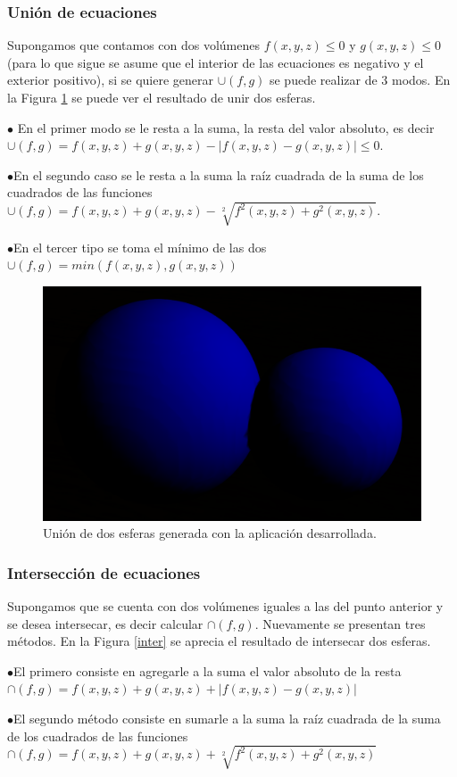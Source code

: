 \documentclass[12pt]{article}
\begin{document}
\subsubsection{Unión de ecuaciones}
\noindent Supongamos que contamos con dos volúmenes $f(x,y,z) \leq 0$ y $g(x,y,z) \leq 0$ (para lo que sigue se asume que el interior de las ecuaciones es negativo y el exterior positivo), si se quiere generar  $\cup(f,g)$ se puede realizar de 3 modos. En la Figura \ref{union} se puede ver el resultado de unir dos esferas.

$\bullet$ En el primer modo se le resta a la suma, la resta del valor absoluto, es decir $\cup(f,g) =  f(x,y,z) + g(x,y,z) - |f(x,y,z) - g(x,y,z)| \leq 0$. 

$\bullet$En el segundo caso se le resta a la suma la raíz cuadrada de la suma de los cuadrados de las funciones  $\cup(f,g) = f(x,y,z) + g(x,y,z) -\sqrt[2]{f^2(x,y,z) + g^2(x,y,z)}$.

$\bullet$En el tercer tipo se toma el mínimo de las dos  $\cup(f,g)=min(f(x,y,z),g(x,y,z))$
\begin{figure}[h!]
\includegraphics[width=0.6\linewidth,center]{oi1.png}
\caption{Unión de dos esferas generada con la aplicación desarrollada.}
\label{union}
\end{figure}

\subsubsection{Intersección de ecuaciones}
\noindent Supongamos que se cuenta con dos volúmenes iguales a las del punto anterior y se desea intersecar, es decir calcular $\cap(f,g)$. Nuevamente se presentan tres métodos. En la Figura  \ref{inter} se aprecia el resultado de intersecar dos esferas.

$\bullet$El primero consiste en agregarle a la suma el valor absoluto de la resta  $\cap(f,g)= f(x,y,z) + g(x,y,z)+ |f(x,y,z) - g(x,y,z)|$ 

$\bullet$El segundo método consiste en sumarle a la suma la raíz cuadrada de la suma de los cuadrados de las funciones   $\cap(f,g)= f(x,y,z) + g(x,y,z)+ \sqrt[2]{f^2(x,y,z) +g^2(x,y,z)}$ 
\end{document}
